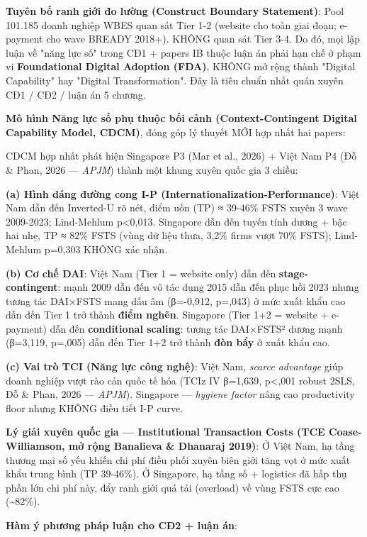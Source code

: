 \documentclass[12pt,a4paper]{article}
\begin{document}
\textbf{Tuyên bố ranh giới đo lường (Construct Boundary Statement)}:
Pool 101.185 doanh nghiệp WBES quan sát Tier 1-2 (website cho toàn giai
đoạn; e-payment cho wave BREADY 2018+). KHÔNG quan sát Tier 3-4. Do đó,
mọi lập luận về "năng lực số" trong CĐ1 + papers IB thuộc luận án phải
hạn chế ở phạm vi \textbf{Foundational Digital Adoption (FDA)}, KHÔNG mở
rộng thành "Digital Capability" hay "Digital Transformation". Đây là
tiêu chuẩn nhất quán xuyên CĐ1 / CĐ2 / luận án 5 chương.

\textbf{Mô hình Năng lực số phụ thuộc bối cảnh (Context-Contingent
Digital Capability Model, CDCM)}, đóng góp lý thuyết MỚI hợp nhất hai
papers:

CDCM hợp nhất phát hiện Singapore P3 (Mar et al., 2026) + Việt Nam P4
(Đỗ \& Phan, 2026 --- \emph{APJM}) thành một khung xuyên quốc gia 3
chiều:

\textbf{(a) Hình dáng đường cong I-P
(Internationalization-Performance)}: Việt Nam dẫn đến Inverted-U rõ nét,
điểm uốn (TP) ≈ 39-46\% FSTS xuyên 3 wave 2009-2023; Lind-Mehlum
p\textless0,013. Singapore dẫn đến tuyến tính dương + bậc hai nhẹ, TP ≈
82\% FSTS (vùng dữ liệu thưa, 3,2\% firms vượt 70\% FSTS); Lind-Mehlum
p=0,303 KHÔNG xác nhận.

\textbf{(b) Cơ chế DAI}: Việt Nam (Tier 1 = website only) dẫn đến
\textbf{stage-contingent}: mạnh 2009 dẫn đến vô tác dụng 2015 dẫn đến
phục hồi 2023 nhưng tương tác DAI×FSTS mang dấu âm (β=-0,912, p=,043) ở
mức xuất khẩu cao dẫn đến Tier 1 trở thành \textbf{điểm nghẽn}.
Singapore (Tier 1+2 = website + e-payment) dẫn đến \textbf{conditional
scaling}: tương tác DAI×FSTS² dương mạnh (β=3,119, p=,005) dẫn đến Tier
1+2 trở thành \textbf{đòn bẩy} ở xuất khẩu cao.

\textbf{(c) Vai trò TCI (Năng lực công nghệ)}: Việt Nam, \emph{scarce
advantage} giúp doanh nghiệp vượt rào cản quốc tế hóa (TCIz IV β=1,639,
p\textless,001 robust 2SLS, Đỗ \& Phan, 2026 --- \emph{APJM}). Singapore
--- \emph{hygiene factor} nâng cao productivity floor nhưng KHÔNG điều
tiết I-P curve.

\textbf{Lý giải xuyên quốc gia --- Institutional Transaction Costs (TCE
Coase-Williamson, mở rộng Banalieva \& Dhanaraj 2019)}: Ở Việt Nam, hạ
tầng thương mại số yếu khiến chi phí điều phối xuyên biên giới tăng vọt
ở mức xuất khẩu trung bình (TP 39-46\%). Ở Singapore, hạ tầng số +
logistics đã hấp thụ phần lớn chi phí này, đẩy ranh giới quá tải
(overload) về vùng FSTS cực cao (\textasciitilde82\%).

\textbf{Hàm ý phương pháp luận cho CĐ2 + luận án}:
\end{document}
